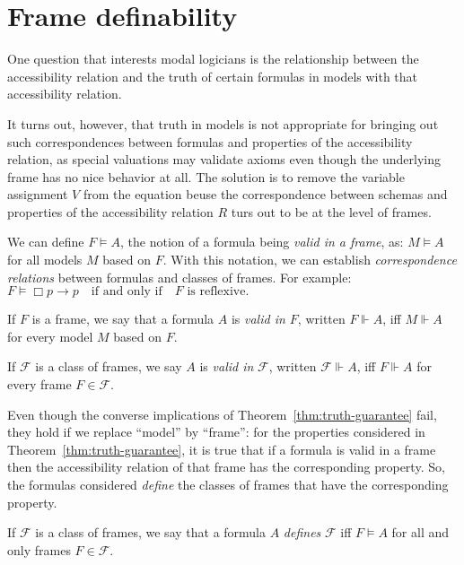 \section{Frame definability}

One question that interests modal logicians is the relationship between 
the accessibility relation and the truth of certain formulas in models 
with that accessibility relation.

It turns out, however, that truth in models is not appropriate for 
bringing out such correspondences between formulas and properties of 
the accessibility relation, as special valuations may validate axioms 
even though the underlying frame has no nice behavior at all. 
The solution is to remove the variable assignment $V$ from the equation beuse 
the correspondence between schemas and properties of the accessibility relation 
$R$ turs out to be at the level of frames.

We can define $F \vDash A$, the notion of a formula being \emph{valid in a frame}, 
as: $M \vDash A$ for all models $M$ based on $F$. With this notation, we can establish 
\emph{correspondence relations} between formulas and classes of frames. For example:
$F \vDash \Box p \rightarrow p \quad \text{if and only if} \quad F \text{ is reflexive.}$

\begin{definition}
  \label{valid-in-frame}
  \leanok
  
  If $F$ is a frame, we say that a formula $A$ is \emph{valid in $F$}, written $F \Vdash A$,
  iff $M \Vdash A$ for every model $M$ based on $F$.

  If $\mathcal{F}$ is a class of frames, we say $A$ is \emph{valid in} $\mathcal{F}$, written $\mathcal{F} \Vdash A$, 
  iff $F \Vdash A$ for every frame $F \in \mathcal{F}$.
\end{definition}


Even though the converse implications of Theorem~\ref{thm:truth-guarantee} 
fail, they hold if we replace ``model'' by ``frame'': for the properties 
considered in Theorem~\ref{thm:truth-guarantee}, it is true that if a 
formula is valid in a frame then the accessibility relation of that frame 
has the corresponding property. So, the formulas considered 
\emph{define} the classes of frames that have the corresponding property.

\begin{definition}
  \label{def:class-of-frame}
  If $\mathcal{F}$ is a class of frames, we say that a formula $A$ 
  \emph{defines} $\mathcal{F}$ iff $F \vDash A$ for all and only frames 
  $F \in \mathcal{F}$.
\end{definition}

